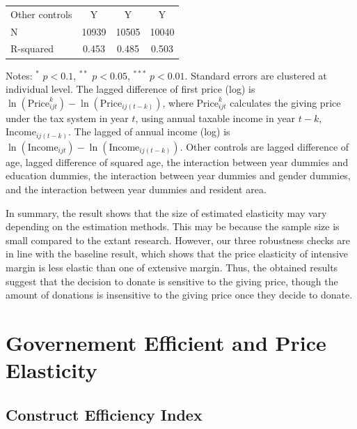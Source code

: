 \documentclass[
  11pt,
  a4paper,
]{article}
\begin{document}
\begin{table}
\begin{threeparttable}
\begin{tabular}[t]{lccc}
  \hspace{1em}Other controls & Y & Y & Y\\
  \hspace{1em}N & 10939 & 10505 & 10040\\
  \hspace{1em}R-squared & 0.453 & 0.485 & 0.503\\
  \bottomrule
  \end{tabular}
  \begin{tablenotes}
  \item Notes: $^{*}$ $p < 0.1$, $^{**}$ $p < 0.05$, $^{***}$ $p < 0.01$. Standard errors are clustered at individual level. The lagged difference of first price (log) is $\ln(\text{Price}^k_{ijt}) - \ln(\text{Price}_{ij(t-k)})$, where $\text{Price}^k_{ijt}$ calculates the giving price under the tax system in year $t$, using annual taxable income in year $t-k$, $\text{Income}_{ij(t-k)}$. The lagged of annual income (log) is $\ln(\text{Income}_{ijt}) - \ln(\text{Income}_{ij(t-k)})$. Other controls are lagged difference of age, lagged difference of squared age, the interaction between year dummies and education dummies, the interaction between year dummies and gender dummies, and the interaction between year dummies and resident area.
  \end{tablenotes}
  \end{threeparttable}
  \end{table}

  In summary, the result shows that the size of estimated elasticity may vary depending on the estimation methods. This may be because the sample size is small compared to the extant research. However, our three robustness checks are in line with the baseline result, which shows that the price elasticity of intensive margin is less elastic than one of extensive margin. Thus, the obtained results suggest that the decision to donate is sensitive to the giving price, though the amount of donations is insensitive to the giving price once they decide to donate.

  \hypertarget{governement-efficient-and-price-elasticity}{%
  \section{Governement Efficient and Price Elasticity}\label{governement-efficient-and-price-elasticity}}

  \hypertarget{construct-efficiency-index}{%
  \subsection{Construct Efficiency Index}\label{construct-efficiency-index}}
\end{document}
